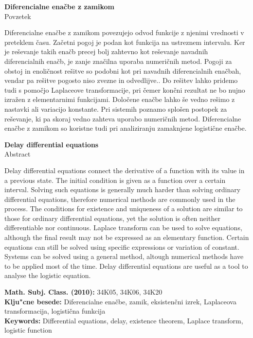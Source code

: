 \documentclass[12pt,a4paper]{amsart}
\theoremstyle{definition} %
\theoremstyle{plain} %
\newcommand{\naslovdela}{Diferencialne enačbe z zamikom}
\begin{document}
\thispagestyle{empty}
\begin{center}
{\bf \naslovdela}\\[3mm]
{\sc Povzetek}
\end{center}
Diferencialne enačbe z zamikom povezujejo odvod funkcije z njenimi vrednosti v preteklem času. Začetni pogoj je 
podan kot funkcija na ustreznem intervalu. Ker je reševanje takih enačb precej bolj zahtevno kot reševanje navadnih 
diferencialnih enačb, je zanje značilna uporaba numeričnih metod. Pogoji za obstoj in enoličnost rešitve so podobni kot
pri navadnih diferencialnih enačbah, vendar pa rešitve pogosto niso zvezne in odvedlijve.. Do rešitev lahko pridemo tudi s 
pomočjo Laplaceove transformacije, pri čemer končni rezultat ne bo nujno izražen z elementarnimi funkcijami. Določene 
enačbe lahko še vedno rešimo z nastavki ali variacijo konstante. Pri sistemih poznamo splošen postopek za reševanje, ki 
pa skoraj vedno zahteva uporabo numeričnih metod. Diferencialne enačbe z zamikom so koristne tudi pri analiziranju 
zamaknjene logistične enačbe.
 \vfill
\begin{center}
{\bf Delay dif\mbox{}ferential equations}\\[3mm] %
{\sc Abstract}
\end{center}
Delay differential equations connect the derivative of a function with its value in a previous state. The initial 
condition is given as a function over a certain interval. Solving such equations is generally much harder than solving 
ordinary dif\mbox{}ferential equations, therefore numerical methods are commonly used in the process. The conditions for 
existence and uniqueness of a solution are similar to those for ordinary dif\mbox{}ferential equations, yet the solution
is often neither dif\mbox{}ferentiable nor continuous. Laplace transform can be used to solve equations, although the final 
result may not be expressed as an elementary function. Certain equations can still be solved using specif\mbox{}ic 
expressions or variation of constant. Systems can be solved using a general method, altough numerical methods 
have to be applied most of the time. Delay dif\mbox{}ferential equations are useful as a tool to analyse
the logistic equation.

\vfill\noindent
{\bf Math. Subj. Class. (2010):} 34K05, 34K06, 34K20  \\[1mm]  
{\bf Klju"cne besede:} Diferencialne enačbe, zamik, eksistenčni izrek, Laplaceova transformacija, logistična funkcija  \\[1mm]  
{\bf Keywords:} Dif\mbox{}ferential equations, delay, existence theorem, Laplace transform, logistic function
\pagebreak
\end{document}
